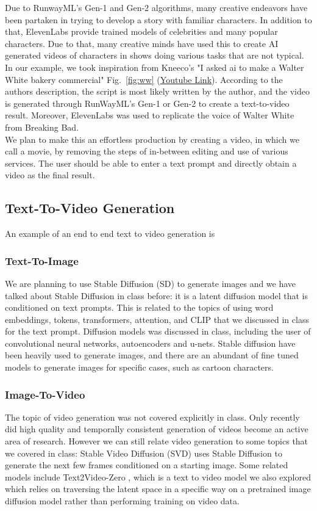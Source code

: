 \documentclass[conference]{IEEEtran}
\begin{document}
Due to RunwayML's Gen-1 and Gen-2 algorithms, many creative endeavors have been partaken in trying to develop a story with familiar characters. In addition to that, ElevenLabs provide trained models of celebrities and many popular characters. Due to that, many creative minds have used this to create AI generated videos of characters in shows doing various tasks that are not typical. In our example, we took inspiration from Kneeco's "I asked ai to make a Walter White bakery commercial" Fig.~\ref{fig:ww} (\href{https://www.youtube.com/watch?v=dgkZTHHom94}{Youtube Link}). According to the authors description, the script is most likely written by the author, and the video is generated through RunWayML's Gen-1 or Gen-2 to create a text-to-video result. Moreover, ElevenLabs was used to replicate the voice of Walter White from Breaking Bad. \\

We plan to make this an effortless production by creating a video, in which we call a movie, by removing the steps of in-between editing and use of various services. The user should be able to enter a text prompt and directly obtain a video as the final result.

\subsection{Text-To-Video Generation}
An example of an end to end text to video generation is 
\subsubsection{Text-To-Image}
We are planning to use Stable Diffusion (SD) \cite{stablediffusion} to generate images and we have talked about 
Stable Diffusion in class before: it is a latent diffusion model that is conditioned on text prompts.
This is related to the topics of using word embeddings, tokens, transformers, attention, and CLIP that we discussed
in class for the text prompt. Diffusion models was discussed in class, including the user of convolutional neural networks, autoencoders and u-nets. Stable diffusion have been heavily used to generate images, and there are an abundant of fine tuned models to generate images for specific cases, such as cartoon characters.
\subsubsection{Image-To-Video}
The topic of video generation was not covered explicitly in class. Only recently did high quality 
and temporally consistent generation of videos become an active area of research.
However we can still relate video generation to some topics that we covered in class:
Stable Video Diffusion (SVD) \cite{svd} uses Stable Diffusion to generate the next few frames conditioned
on a starting image. Some related models include Text2Video-Zero \cite{text2vid-gh}, which is a text to video model we also explored which relies on traversing the latent space in a specific way on a pretrained image diffusion model rather than performing training on video data. 
\end{document}
